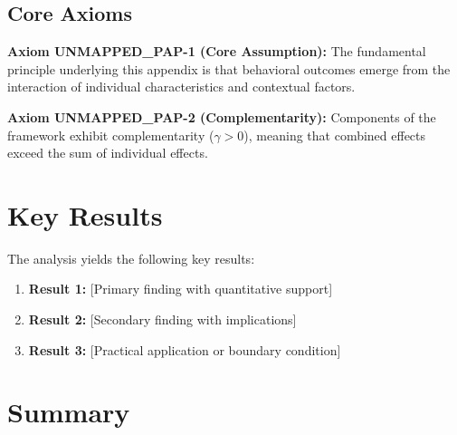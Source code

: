 

\subsection{Core Axioms}
\label{sec:pap-axioms}

\begin{tcolorbox}[colback=yellow!5!white,colframe=yellow!75!black,title=Axiom UNMAPPED_PAP-1: Fundamental Principle]
\textbf{Axiom UNMAPPED_PAP-1 (Core Assumption):}
The fundamental principle underlying this appendix is that behavioral outcomes
emerge from the interaction of individual characteristics and contextual factors.
\end{tcolorbox}

\begin{tcolorbox}[colback=yellow!5!white,colframe=yellow!75!black,title=Axiom UNMAPPED_PAP-2: Complementarity]
\textbf{Axiom UNMAPPED_PAP-2 (Complementarity):}
Components of the framework exhibit complementarity ($\gamma > 0$), meaning
that combined effects exceed the sum of individual effects.
\end{tcolorbox}


\section{Key Results}
\label{sec:pap-results}

The analysis yields the following key results:

\begin{enumerate}
    \item \textbf{Result 1:} [Primary finding with quantitative support]
    \item \textbf{Result 2:} [Secondary finding with implications]
    \item \textbf{Result 3:} [Practical application or boundary condition]
\end{enumerate}


\section{Summary}
\label{sec:pap-summary}

